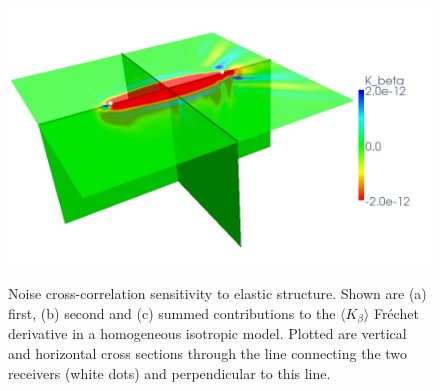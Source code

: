 \documentclass[referee,extra]{gji}
\begin{document}
\begin{figure}
\begin{center}
\begin{minipage}[t]{0.49\textwidth}
\begin{center}
\includegraphics[width=1.\textwidth]{./images/noise_beta_sum.jpg}\\
\end{center}
\end{minipage}
\end{center}
\caption{Noise cross-correlation sensitivity to elastic structure.
Shown are (a) first, (b) second
and (c) summed contributions to the $\langle K_\beta\rangle$ Fr\'echet derivative
in a homogeneous isotropic model.
Plotted are vertical and horizontal cross sections through the line connecting the two receivers (white dots) and perpendicular to this line.
}
\label{figure:kernelnoise}
\end{figure}
\end{document}
